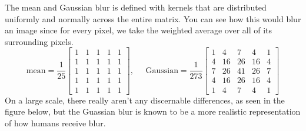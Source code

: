 \documentclass{article}
\begin{document}
    \begin{example}
      The mean and Gaussian blur is defined with kernels that are distributed uniformly and normally across the entire matrix. You can see how this would blur an image since for every pixel, we take the weighted average over all of its surrounding pixels. 
      \[\text{mean} = \frac{1}{25} \begin{bmatrix} 1 & 1 & 1 & 1 & 1 \\ 1 & 1 & 1 & 1 & 1 \\ 1 & 1 & 1 & 1 & 1 \\ 1 & 1 & 1 & 1 & 1 \\ 1 & 1 & 1 & 1 & 1 \end{bmatrix}, \;\;\;\;\; \text{Gaussian} = \frac{1}{273} \begin{bmatrix} 1 & 4 & 7 & 4 & 1 \\ 4 & 16 & 26 & 16 & 4 \\ 7 & 26 & 41 & 26 & 7 \\ 4 & 16 & 26 & 16 & 4 \\ 1 & 4 & 7 & 4 & 1 \end{bmatrix}\]
      On a large scale, there really aren't any discernable differences, as seen in the figure below, but the Guassian blur is known to be a more realistic representation of how humans receive blur. 


\end{example}
\end{document}
